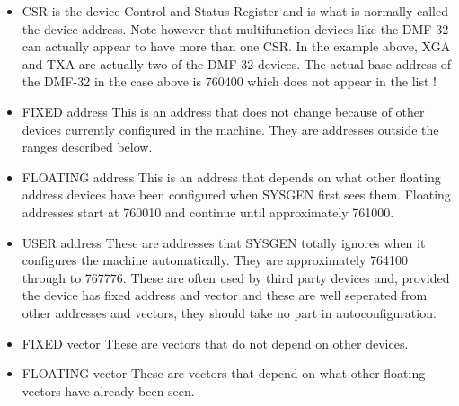\begin{itemize}
\item{CSR} is the device Control and Status Register and is what is
 normally called the device address.
 Note however that multifunction devices like the DMF-32 can actually appear
 to have more than one CSR.
 In the example above, XGA and TXA are actually two of the DMF-32
 devices.
 The actual base address of the DMF-32 in the case above is 760400
 which does not appear in the list !

\item{FIXED address} This is an address that does not change because of
 other devices currently configured in the machine.
They are addresses outside the ranges described below.

\item{FLOATING address} This is an address that depends on what other
 floating address devices have been configured when SYSGEN first sees them.
 Floating addresses start at 760010 and continue until approximately
 761000.

\item{USER address} These are addresses that SYSGEN totally ignores when it
 configures the machine automatically.
They are approximately 764100 through to 767776.
These are often used by third party devices and, provided the device has
fixed address and vector and these are well seperated from other
addresses and vectors, they should take no part in autoconfiguration.

\item{FIXED vector} These are vectors that do not depend on other devices.

\item{FLOATING vector} These are vectors that depend on what other floating
vectors have already been seen.
\end{itemize}


